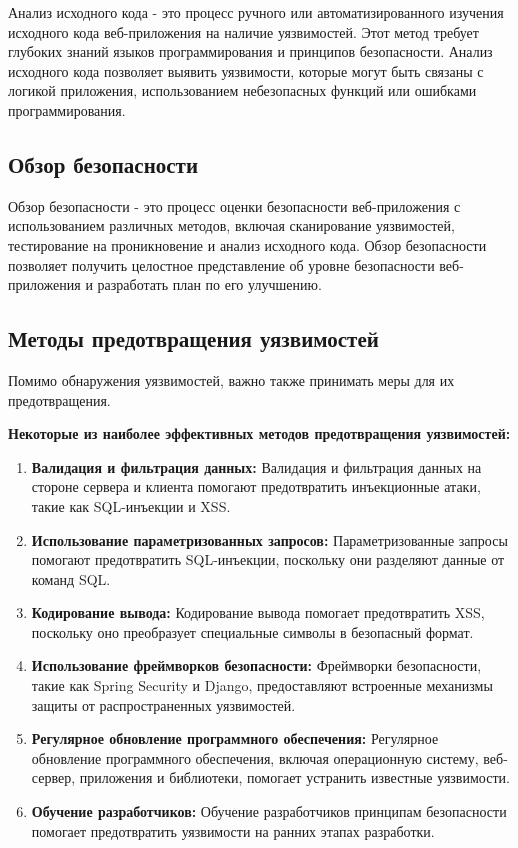 \documentclass[a4paper,12pt]{diplom}
\begin{document}
	 Анализ исходного кода - это процесс ручного или автоматизированного изучения исходного кода веб-приложения на наличие уязвимостей.  Этот метод требует глубоких знаний языков программирования и принципов безопасности.  Анализ исходного кода позволяет выявить уязвимости, которые могут быть связаны с логикой приложения, использованием небезопасных функций или ошибками программирования.
	 
	 \subsection{Обзор безопасности}
	 
	 Обзор безопасности - это процесс оценки безопасности веб-приложения с использованием различных методов, включая сканирование уязвимостей, тестирование на проникновение и анализ исходного кода.  Обзор безопасности позволяет получить целостное представление об уровне безопасности веб-приложения и разработать план по его улучшению.
	 
	 \subsection{Методы предотвращения уязвимостей}
	 
	 Помимо обнаружения уязвимостей, важно также принимать меры для их предотвращения.  
	 
	 \textbf{Некоторые из наиболее эффективных методов предотвращения уязвимостей:}
	 
	 \begin{enumerate}[label=\arabic{enumi})]
	 	\item \textbf{Валидация и фильтрация данных:}  Валидация и фильтрация данных на стороне сервера и клиента помогают предотвратить инъекционные атаки, такие как SQL-инъекции и XSS.
	 	\item \textbf{Использование параметризованных запросов:}  Параметризованные запросы помогают предотвратить SQL-инъекции, поскольку они разделяют данные от команд SQL. 
	 	\item \textbf{Кодирование вывода:}  Кодирование вывода помогает предотвратить XSS, поскольку оно преобразует специальные символы в безопасный формат.
	 	\item \textbf{Использование фреймворков безопасности:}  Фреймворки безопасности, такие как Spring Security и Django, предоставляют встроенные механизмы защиты от распространенных уязвимостей.
	 	\item \textbf{Регулярное обновление программного обеспечения:}  Регулярное обновление программного обеспечения, включая операционную систему, веб-сервер, приложения и библиотеки, помогает устранить известные уязвимости.
	 	\item \textbf{Обучение разработчиков:}  Обучение разработчиков принципам безопасности помогает предотвратить уязвимости на ранних этапах разработки. 
	 \end{enumerate}
	 
\end{document}
